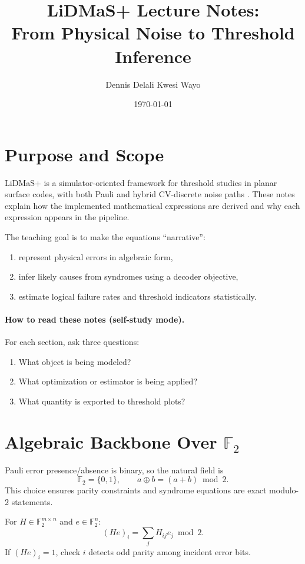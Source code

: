 \documentclass[11pt]{article}
\title{LiDMaS+ Lecture Notes:\\From Physical Noise to Threshold Inference}
\author{
Dennis Delali Kwesi Wayo \orcidlink{0000-0001-9980-6247}}
\date{\today}
\newcommand{\F}{\mathbb{F}_2}
\begin{document}
\maketitle
\tableofcontents

\section{Purpose and Scope}
LiDMaS+ is a simulator-oriented framework for threshold studies in planar surface codes, with both Pauli and hybrid CV-discrete noise paths \cite{wayo2026lidmas}. These notes explain how the implemented mathematical expressions are derived and why each expression appears in the pipeline.

The teaching goal is to make the equations ``narrative'':
\begin{enumerate}[label=\arabic*.]
  \item represent physical errors in algebraic form,
  \item infer likely causes from syndromes using a decoder objective,
  \item estimate logical failure rates and threshold indicators statistically.
\end{enumerate}

\paragraph{How to read these notes (self-study mode).}
For each section, ask three questions:
\begin{enumerate}[label=\arabic*.]
  \item What object is being modeled?
  \item What optimization or estimator is being applied?
  \item What quantity is exported to threshold plots?
\end{enumerate}

\section{Algebraic Backbone Over \texorpdfstring{$\F$}{F2}}
Pauli error presence/absence is binary, so the natural field is
\begin{equation}
\F = \{0,1\},\qquad a\oplus b=(a+b)\bmod 2.
\end{equation}
This choice ensures parity constraints and syndrome equations are exact modulo-2 statements.

For $H\in\F^{m\times n}$ and $e\in\F^n$:
\begin{equation}
(He)_i=\sum_j H_{ij}e_j \bmod 2.
\end{equation}
If $(He)_i=1$, check $i$ detects odd parity among incident error bits.
\end{document}
